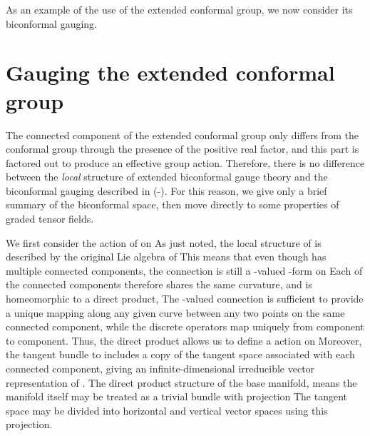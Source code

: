 \documentclass[a4paper,12pt]{article}
\begin{document}
As an example of the use of the extended conformal group, we now consider
its biconformal gauging.

\section{Gauging the extended conformal group}

The connected component of the extended conformal group only differs from
the conformal group through the presence of the positive real factor, \coordHE{} and this part is factored out to produce an effective group
action. Therefore, there is no difference between the \textit{local}
structure of extended biconformal gauge theory and the biconformal gauging
described in (\cite{New Conformal Gauging Paper}-\cite{WWIII}). For this reason, we give only a brief summary of the biconformal space, then move directly to some properties of graded tensor fields.

We first consider the action of \coordHE{} on \coordHE{} As just noted, the local structure of \coordHE{} is described
by the original Lie algebra of \coordHE{} This means that even though \coordHE{} has multiple connected components, the connection is still a \coordHE{}-valued \coordHE{}-form on \coordHE{} Each of the connected
components therefore shares the same curvature, and \coordHE{} is
homeomorphic to a direct product, \coordHE{} The \coordHE{}-valued connection is sufficient to provide a unique \coordHE{} mapping
along any given curve between any two points on the same connected
component, while the discrete operators \coordHE{} map uniquely from component
to component. Thus, the direct product allows us to define a \coordHE{} action on \coordHE{} Moreover, the tangent bundle to \coordHE{} includes a copy of the tangent space associated with each connected
component, giving an infinite-dimensional irreducible vector representation
of \coordHE{}. The direct product structure of the base manifold, \coordHE{} means the manifold itself may be treated as a
trivial bundle with projection \coordHE{} The
tangent space \coordHE{} may be divided into horizontal and vertical
vector spaces using this projection.
\end{document}
